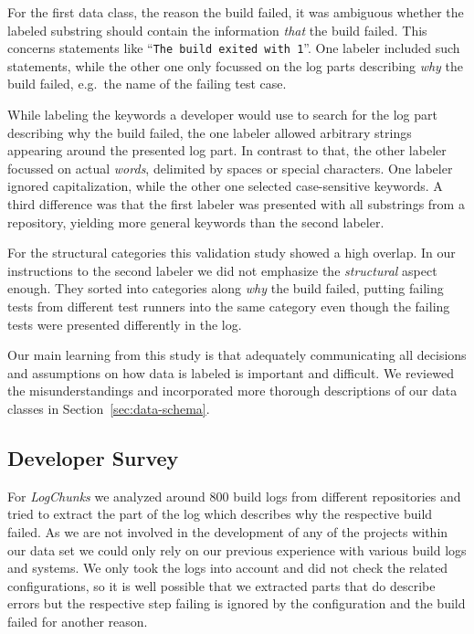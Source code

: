 \documentclass[\myrootdir/main.tex]{subfiles}
\begin{document}
For the first data class, the reason the build failed, it was ambiguous whether the labeled substring should contain the information \emph{that} the build failed.
This concerns statements like ``\texttt{The build exited with 1}''.
One labeler included such statements, while the other one only focussed on the log parts describing \emph{why} the build failed, e.g.\ the name of the failing test case.

While labeling the keywords a developer would use to search for the log part describing why the build failed, the one labeler allowed arbitrary strings appearing around the presented log part.
In contrast to that, the other labeler focussed on actual \emph{words}, delimited by spaces or special characters.
One labeler ignored capitalization, while the other one selected case-sensitive keywords.
A third difference was that the first labeler was presented with all substrings from a repository, yielding more general keywords than the second labeler.

For the structural categories this validation study showed a high overlap.
In our instructions to the second labeler we did not emphasize the \emph{structural} aspect enough.
They sorted into categories along \emph{why} the build failed, putting failing tests from different test runners into the same category even though the failing tests were presented differently in the log.

Our main learning from this study is that adequately communicating all decisions and assumptions on how data is labeled is important and difficult.
We reviewed the misunderstandings and incorporated more thorough descriptions of our data classes in Section~\ref{sec:data-schema}.


\subsection{Developer Survey}
For \emph{LogChunks} we analyzed around 800 build logs from different repositories and tried to extract the part of the log which describes why the respective build failed.
As we are not involved in the development of any of the projects within our data set we could only rely on our previous experience with various build logs and systems.
We only took the logs into account and did not check the related configurations, so it is well possible that we extracted parts that do describe errors but the respective step failing is ignored by the configuration and the build failed for another reason.
\end{document}
